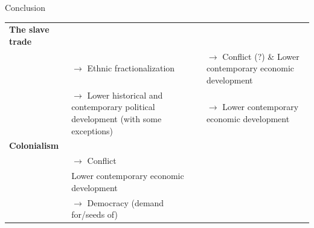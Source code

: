 \documentclass{beamer}
\begin{document}
\begin{frame}{Conclusion}
	\begin{table}
	\begin{tabularx}{\textwidth}{>{\centering\arraybackslash}X>{\centering\arraybackslash}X>{\centering\arraybackslash}X}
		\textbf{The slave trade} & & \\
					 & $\rightarrow$ Ethnic
		fractionalization & $\rightarrow$ Conflict (?) \& Lower
		contemporary economic development \\	
					 & $\rightarrow$ Lower historical and contemporary political development (with
		some exceptions) & $\rightarrow$ Lower contemporary economic development \\
		\textbf{Colonialism} & & \\
				     & $\rightarrow$ Conflict & \\
			& Lower contemporary economic development & \\
			& $\rightarrow$ Democracy (demand for/seeds of) \\
	\end{tabularx}
	\end{table}
\end{frame}
\end{document}
